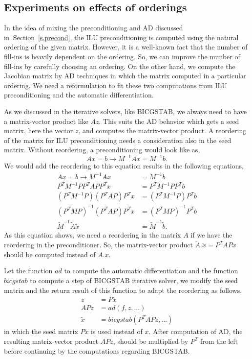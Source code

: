\documentclass[12pt, twoside,a4paper,toc=bibliography]{scrbook}
\newcommand{\secref}[1]{Section~\protect\ref{#1}}
\begin{document}
\subsection{Experiments on effects of orderings}
\label{s.ilu}
In the idea of mixing the preconditioning and AD discussed in~\secref{s.precond},
the ILU preconditioning is computed using the natural ordering of the given matrix. However,
it is a well-known fact that the number of fill-ins is heavily dependent on the ordering.
So, we can improve the number of fill-ins by carefully choosing an ordering.
On the other hand, we compute the Jacobian matrix by AD techniques in which
the matrix computed in a particular ordering. We need a reformulation to
fit these two computations from ILU preconditioning and the automatic differentiation.

As we discussed in the iterative solvers, like BICGSTAB,
we always need to have a matrix-vector product like $Az$.
This suits the AD behavior which gets a seed matrix, here the vector $z$, and
computes the matrix-vector product.
A reordering of the matrix for ILU preconditioning
needs a consideration also in the seed matrix.
Without reordering, a preconditioning would look like as,
$$
Ax = b \rightarrow M^{-1} Ax = M^{-1}b.
$$
We would add the reordering to this equation results in the following equations,
\begin{align*}
Ax = b \rightarrow M^{-1} Ax &= M^{-1}b\\
P^T M^{-1} P P^T A P P^T x &= P^T M^{-1} P P^T b\\
(P^T M^{-1} P) (P^T A P) P^T x &= (P^T M^{-1} P) P^T b\\
(P^T M P)^{-1} (P^T A P) P^T x &= (P^T M P)^{-1} P^T b\\
\tilde{M}^{-1}\tilde{A}\tilde{x} &= \tilde{M}^{-1}\tilde{b}.
\end{align*}
As this equation shows, we need a reordering in the matrix $A$ if we
have the reordering in the preconditioner.
So, the matrix-vector product $\tilde{A}.\tilde{x} = P^T A P x$
should be computed instead of $A.x$.

Let the function $ad$ to compute the automatic differentiation
and the function $bicgstab$ to compute a step of BICGSTAB iterative solver,
we modify the seed matrix and the return result of this function
to adapt the reordering as follows,
\begin{align*}
z &= P \tilde{x}\\
APz &= ad(f,z,...)\\
\tilde{x} &= bicgstab(P^T APz,...)
\end{align*}
in which the seed matrix $P \tilde{x}$ is used instead of $x$.
After computation of AD, the resulting matrix-vector product $APz$,
should be multiplied by $P^T$ from the left before continuing by the
computations regarding BICGSTAB.
\end{document}
